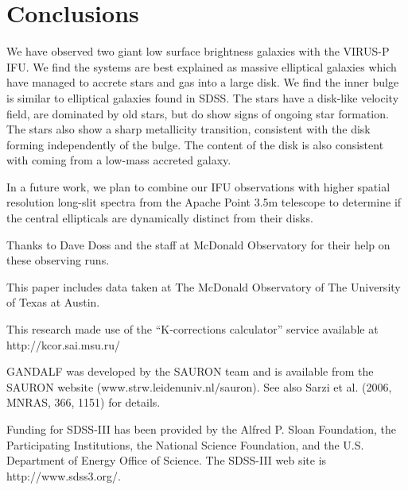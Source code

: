 \documentclass{emulateapj}
\newcommand\HI{\ion{H}{1}}
\begin{document}
\section{Conclusions}

We have observed two giant low surface brightness galaxies with the VIRUS-P IFU.  We find the systems are best explained as massive elliptical galaxies which have managed to accrete stars and gas into a large disk.  We find the inner bulge is similar to elliptical galaxies found in SDSS.  The stars have a disk-like velocity field, are dominated by old stars, but do show signs of ongoing star formation. The stars also show a sharp metallicity transition, consistent with the disk forming independently of the bulge. The \HI content of the disk is also consistent with coming from a low-mass accreted galaxy.

In a future work, we plan to combine our IFU observations with higher spatial resolution long-slit spectra from the Apache Point 3.5m telescope to determine if the central ellipticals are dynamically distinct from their disks.  

\acknowledgments
Thanks to Dave Doss and the staff at McDonald Observatory for their help on these observing runs. 

This paper includes data taken at The McDonald Observatory of The University of Texas at Austin.


This research made use of the ``K-corrections calculator'' service available at http://kcor.sai.msu.ru/

GANDALF was developed by the SAURON team and is available from the SAURON website (www.strw.leidenuniv.nl/sauron). See also Sarzi et al. (2006, MNRAS, 366, 1151) for details.

Funding for SDSS-III has been provided by the Alfred P. Sloan Foundation, the Participating Institutions, the National Science Foundation, and the U.S. Department of Energy Office of Science. The SDSS-III web site is http://www.sdss3.org/.
\end{document}
